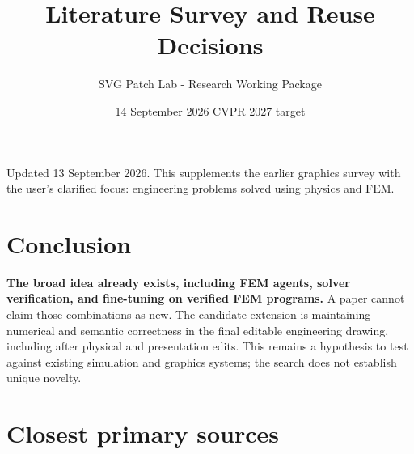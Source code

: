 \documentclass[
  11pt,
  a4paper,
]{article}
\title{Literature Survey and Reuse Decisions}
\author{SVG Patch Lab - Research Working Package}
\date{14 September 2026 \textbar{} CVPR 2027 target}
\let\originaltableofcontents\tableofcontents
\renewcommand{\tableofcontents}{\originaltableofcontents\clearpage}
\begin{document}
\maketitle

{
\setcounter{tocdepth}{2}
\tableofcontents
}
Updated 13 September 2026. This supplements the earlier graphics survey
with the user's clarified focus: engineering problems solved using
physics and FEM.

\section{Conclusion}\label{conclusion}

\textbf{The broad idea already exists, including FEM agents, solver
verification, and fine-tuning on verified FEM programs.} A paper cannot
claim those combinations as new. The candidate extension is maintaining
numerical and semantic correctness in the final editable engineering
drawing, including after physical and presentation edits. This remains a
hypothesis to test against existing simulation and graphics systems; the
search does not establish unique novelty.

\section{Closest primary sources}\label{closest-primary-sources}
\end{document}
